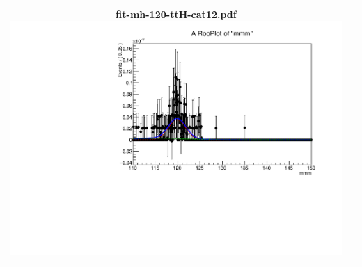 \begin{longtable}{|c|c|}
{}
 \\
\hline
\parbox{0.49\textwidth}{
\centering
{\bfseries fit-mh-120-ttH-cat12.pdf}
\includegraphics[width=.49\textwidth]{figures/signal_model/AppendixBdt/ttH/120/fit_mh_120_ttH_cat12.pdf}
}
 & \\ \hline
\end{longtable}
